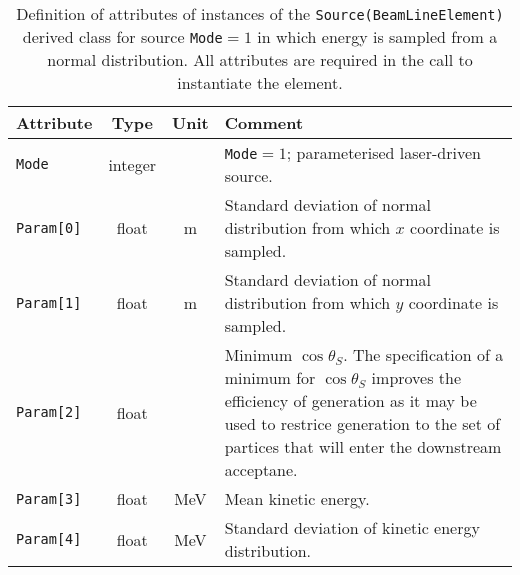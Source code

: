 \begin{table}[h]
  \caption{
    Definition of attributes of instances of
    the \texttt{Source(BeamLineElement)} derived class for
    source \texttt{Mode}$=1$ in which energy is sampled from a normal
    distribution.
    All attributes are required in the call to instantiate the
    element.
  }
  \label{Tab:Source:AttributesB}
  \begin{center}
    \begin{tabular}{|l|c|c|p{10cm}|}
      \hline
      \textbf{Attribute} & \textbf{Type}      & \textbf{Unit} & \textbf{Comment}                    \\
      \hline
      \texttt{Mode}      & integer &          & \texttt{Mode}$=1$; parameterised laser-driven source.        \\
      \hline
       \texttt{Param[0]} & float   & m        & Standard deviation of normal distribution from which $x$ coordinate is sampled. \\
       \texttt{Param[1]} & float   & m        & Standard deviation of normal distribution from which $y$ coordinate is sampled. \\
       \texttt{Param[2]} & float   &          & Minimum $\cos\theta_S$.
                                                The specification of a minimum for $\cos\theta_S$ improves the efficiency of
                                                generation as it may be used to restrice generation to the set of partices that
                                                will enter the downstream acceptane.                                            \\
       \texttt{Param[3]} & float   & MeV      & Mean kinetic energy.                                          \\
       \texttt{Param[4]} & float   & MeV      & Standard deviation of kinetic energy distribution.            \\
      \hline
    \end{tabular}
  \end{center}
\end{table}
